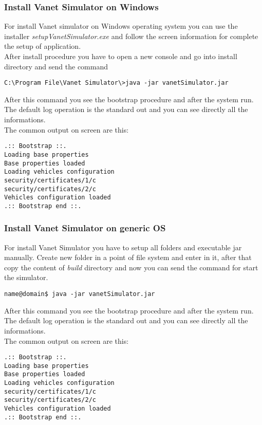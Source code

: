 \subsubsection{Install Vanet Simulator on Windows}
For install Vanet simulator on Windows operating system you can use the installer \textit{setupVanetSimulator.exe} and follow the screen information for complete the setup of application.\\
After install procedure you have to open a new console and go into install directory and send the command
\begin{verbatim}
C:\Program File\Vanet Simulator\>java -jar vanetSimulator.jar
\end{verbatim}
After this command you see the bootstrap procedure and after the system run. The default log operation is the standard out and you can see directly all the informations.\\
The common output on screen are this:
\begin{verbatim}
.:: Bootstrap ::.
Loading base properties
Base properties loaded
Loading vehicles configuration
security/certificates/1/c
security/certificates/2/c
Vehicles configuration loaded
.:: Bootstrap end ::.
\end{verbatim}
\subsubsection{Install Vanet Simulator on generic OS}
For install Vanet Simulator you have to setup all folders and executable jar manually. Create new folder in a point of file system and enter in it, after that copy the content of \textit{build} directory and now you can send the command for start the simulator.
\begin{verbatim}
name@domain$ java -jar vanetSimulator.jar
\end{verbatim}
After this command you see the bootstrap procedure and after the system run. The default log operation is the standard out and you can see directly all the informations.\\
The common output on screen are this:
\begin{verbatim}
.:: Bootstrap ::.
Loading base properties
Base properties loaded
Loading vehicles configuration
security/certificates/1/c
security/certificates/2/c
Vehicles configuration loaded
.:: Bootstrap end ::.
\end{verbatim}

